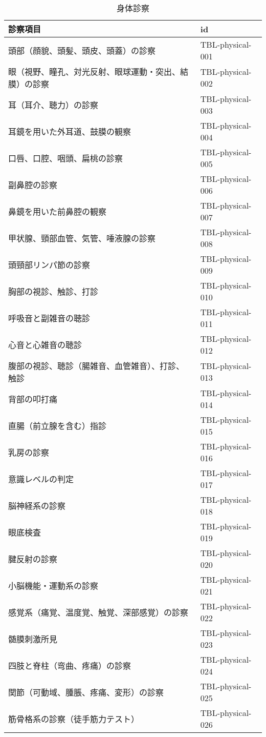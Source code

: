 \begin{xltabular}{\linewidth}{XX}
\caption{\label{tbl:physical}身体診察} \\
\toprule
診察項目 & id \\
\midrule
\endhead
頭部（顔貌、頭髪、頭皮、頭蓋）の診察 & TBL-physical-001 \\
眼（視野、瞳孔、対光反射、眼球運動・突出、結膜）の診察 & TBL-physical-002 \\
耳（耳介、聴力）の診察 & TBL-physical-003 \\
耳鏡を用いた外耳道、鼓膜の観察 & TBL-physical-004 \\
口唇、口腔、咽頭、扁桃の診察 & TBL-physical-005 \\
副鼻腔の診察 & TBL-physical-006 \\
鼻鏡を用いた前鼻腔の観察 & TBL-physical-007 \\
甲状腺、頸部血管、気管、唾液腺の診察 & TBL-physical-008 \\
頭頸部リンパ節の診察 & TBL-physical-009 \\
胸部の視診、触診、打診 & TBL-physical-010 \\
呼吸音と副雑音の聴診 & TBL-physical-011 \\
心音と心雑音の聴診 & TBL-physical-012 \\
腹部の視診、聴診（腸雑音、血管雑音）、打診、触診 & TBL-physical-013 \\
背部の叩打痛 & TBL-physical-014 \\
直腸（前立腺を含む）指診 & TBL-physical-015 \\
乳房の診察 & TBL-physical-016 \\
意識レベルの判定 & TBL-physical-017 \\
脳神経系の診察 & TBL-physical-018 \\
眼底検査 & TBL-physical-019 \\
腱反射の診察 & TBL-physical-020 \\
小脳機能・運動系の診察 & TBL-physical-021 \\
感覚系（痛覚、温度覚、触覚、深部感覚）の診察 & TBL-physical-022 \\
髄膜刺激所見 & TBL-physical-023 \\
四肢と脊柱（弯曲、疼痛）の診察 & TBL-physical-024 \\
関節（可動域、腫脹、疼痛、変形）の診察 & TBL-physical-025 \\
筋骨格系の診察（徒手筋力テスト） & TBL-physical-026 \\
\bottomrule
\end{xltabular}

